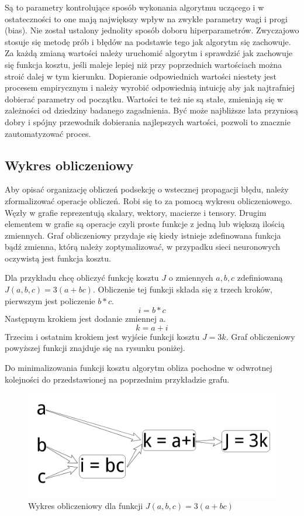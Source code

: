 \documentclass[12pt,a4paper,twoside,titlepage,openright]{book}
\begin{document}
Są to parametry kontrolujące sposób wykonania algorytmu uczącego i w ostateczności to one mają największy wpływ na zwykłe parametry wagi i progi (bias). Nie został ustalony jednolity sposób doboru hiperparametrów. Zwyczajowo stosuje się metodę prób i błędów na podstawie tego jak algorytm się zachowuje.\cite{deeplearningAI} Za każdą zmianą wartości należy uruchomić algorytm i sprawdzić jak zachowuje się funkcja kosztu, jeśli maleje lepiej niż przy poprzednich wartościach można stroić dalej w tym kierunku. Dopieranie odpowiednich wartości niestety jest procesem empirycznym i należy wyrobić odpowiednią intuicję aby jak najtrafniej dobierać parametry od początku. Wartości te też nie są stałe, zmieniają się w zależności od dziedziny badanego zagadnienia. Być może najbliższe lata przyniosą dobry i spójny przewodnik dobierania najlepszych wartości, pozwoli to znacznie zautomatyzować proces.

\subsection{Wykres obliczeniowy}
Aby opisać organizację obliczeń podsekcję o wstecznej propagacji błędu, należy zformalizować operacje obliczeń. Robi się to za pomocą wykresu obliczeniowego. Węzły w grafie reprezentują skalary, wektory, macierze i tensory. Drugim elementem w grafie są operacje czyli proste funkcje z jedną lub większą ilością zmiennych. Graf obliczeniowy przydaje się kiedy istnieje zdefinowana funkcja bądź zmienna, którą należy zoptymalizować, w przypadku sieci neuronowych oczywistą jest funkcja kosztu.

Dla przykładu chcę obliczyć funkcję kosztu \(J\) o zmiennych \(a,b,c\) zdefiniowaną \(J(a,b,c) = 3(a+bc)\). Obliczenie tej funkcji składa się z trzech kroków, pierwszym jest policzenie \(b*c\).
$$i = b * c$$
Następnym krokiem jest dodanie zmiennej a.
$$k = a + i$$
Trzecim i ostatnim krokiem jest wyjście funkcji kosztu \(J = 3k\).
Graf obliczeniowy powyższej funkcji znajduje się na rysunku poniżej.

Do minimalizowania funkcji kosztu algorytm obliza pochodne w odwrotnej kolejności do przedstawionej na poprzednim przykładzie grafu.

\begin{figure}[h]
	\centering
			\includegraphics[resolution=100, scale=0.5]{ComputationGraph.png}
		\caption{Wykres obliczeniowy dla funkcji \(J(a,b,c) = 3(a+bc)\)}
\end{figure}
\end{document}
